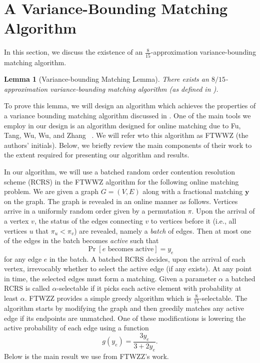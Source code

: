 \documentclass[letterpaper,11pt]{article}
\makeatletter
\newtheorem{lemma}{Lemma}[section]
\renewcommand{\paragraph}{\@startsection{paragraph}{4}{\z@}{10pt}{-1em}{\normalfont\normalsize\bfseries}}
\makeatother
\begin{document}
 \section{A Variance-Bounding Matching Algorithm}\label{secvariancebounding}
In this section, we discuss the existence of an $\frac{8}{15}$-approximation variance-bounding matching algorithm.
\begin{lemma}[Variance-bounding Matching Lemma]\label{lem:vertexindependent}
There exists an $8/15$-approximation variance-bounding matching algorithm (as defined in ).
\end{lemma}

To prove this lemma, we will design  an algorithm which achieves the properties of a variance bounding matching algorithm discussed in .
One of the main tools we employ in our design  is an algorithm designed for online matching due to Fu, Tang, Wu, Wu, and Zhang ~\cite{Fu}. We will refer wto this algorithm as FTWWZ (the authors' initials). Below, we briefly review the main components of their work to the extent required for presenting our algorithm and results.


\paragraph{Batched RCRS:} \label{sec:Fualgorithm} In our algorithm, we will use a batched  random order contention
resolution scheme (RCRS) in the FTWWZ algorithm for the following online matching problem. We are given a graph $G=(V,E)$ along with a fractional matching $\bm{y}$ on the graph. The graph is revealed in an online manner as follows.  Vertices arrive in a uniformly random order given by a permutation $\pi$. Upon the arrival of a vertex $v$, the status of the edges connecting $v$ to vertices before it (i.e., all vertices $u$ that $\pi_u < \pi_v$)  are revealed, namely a \emph{batch} of edges. 
Then at most one of the edges in the batch becomes \emph{active} such that $$\Pr[e \text{ becomes active}] =  y_e$$ for any edge $e$ in  the batch. A batched RCRS decides, upon the arrival of each vertex, irrevocably whether to select the active edge (if any exists). At any point in time, the selected edges must form a matching. Given a parameter $\alpha$ a batched RCRS is called $\alpha$-selectable if it picks each active element with probability at least $\alpha$. FTWZZ provides a simple greedy algorithm which is $\frac{8}{15}$-selectable. The algorithm starts by  modifying the graph and then greedily matches any active edge if its endpoints are unmatched. One of these modifications is lowering the active probability of each edge using a function \begin{equation}\label{g(yv)}
    g(y_e)=\frac{3y_e}{3+2y_e}.
\end{equation} Below is the main result we use from FTWZZ's work.
\end{document}
